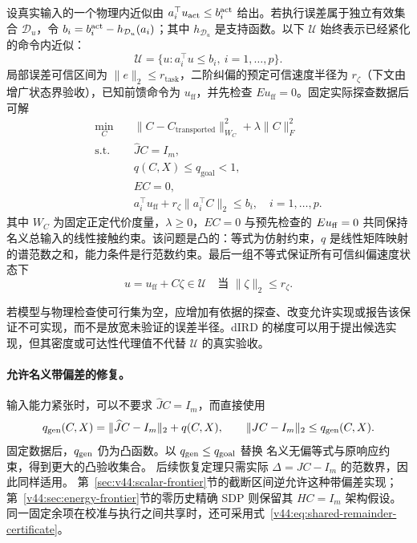 \documentclass[11pt,a4paper]{article}
\numberwithin{equation}{section}
\theoremstyle{definition}
\begin{document}
设真实输入的一个物理内近似由 $a_i^\top u_{\rm act}\le b_i^{\rm act}$ 给出。若执行误差属于独立有效集合 $\mathcal D_u$，令 $b_i=b_i^{\rm act}-h_{\mathcal D_u}(a_i)$；其中 $h_{\mathcal D_u}$ 是支持函数。以下 $\mathcal U$ 始终表示已经紧化的命令内近似：
\begin{equation}
  \mathcal U=
  \{u:a_i^\top u\le b_i,\ i=1,\ldots,p\}.
\end{equation}
局部误差可信区间为 $\|e\|_2\le r_{\mathrm{task}}$，二阶纠偏的预定可信速度半径为 $r_\zeta$（下文由增广状态界验收），已知前馈命令为 $u_{\mathrm{ff}}$，并先检查 $Eu_{\mathrm{ff}}=0$。固定实际探查数据后可解
\begin{equation}
\begin{aligned}
  \min_C\quad&
  \|C-C_{\mathrm{transported}}\|_{W_C}^2+
  \lambda\|C\|_F^2\\
  \text{s.t.}\quad&
  \widehat JC=I_m,\\
  &q(C,X)\le q_{\mathrm{goal}}<1,\\
  &EC=0,\\
  &a_i^\top u_{\mathrm{ff}}
   +r_\zeta\|a_i^\top C\|_2
   \le b_i,\quad i=1,\ldots,p.
\end{aligned}
\label{eq:cal-convex-repair}
\end{equation}
其中 $W_C$ 为固定正定代价度量，$\lambda\ge0$，$EC=0$ 与预先检查的 $Eu_{\rm ff}=0$ 共同保持名义总输入的线性接触约束。该问题是凸的：等式为仿射约束，$q$ 是线性矩阵映射的谱范数之和，能力条件是行范数约束。最后一组不等式保证所有可信纠偏速度状态下
\begin{equation}
  u=u_{\mathrm{ff}}+C\zeta\in\mathcal U\quad\text{当 }\|\zeta\|_2\le r_\zeta .
\end{equation}

若模型与物理检查使可行集为空，应增加有依据的探查、改变允许实现或报告该保证不可实现，而不是放宽未验证的误差半径。dIRD 的梯度可以用于提出候选实现，但其密度或可达性代理值不代替 $\mathcal U$ 的真实验收。




\paragraph{允许名义带偏差的修复。}
输入能力紧张时，可以不要求 $\widehat JC=I_m$，而直接使用
\begin{equation}
 q_{\rm gen}(C,X)=\|\widehat JC-I_m\|_2+q(C,X),
 \qquad \|JC-I_m\|_2\le q_{\rm gen}(C,X).
 \label{v44:eq:general-biased-certificate}
\end{equation}
固定数据后，$q_{\rm gen}$ 仍为凸函数。以 $q_{\rm gen}\le q_{\rm goal}$ 替换
名义无偏等式与原响应约束，得到更大的凸验收集合。
后续恢复定理只需实际 $\Delta=JC-I_m$ 的范数界，因此同样适用。
第~\ref{sec:v44:scalar-frontier}节的截断区间逆允许这种带偏差实现；
第~\ref{v44:sec:energy-frontier}节的零历史精确 SDP 则保留其 $HC=I_m$ 架构假设。
同一固定余项在校准与执行之间共享时，还可采用式~\eqref{v44:eq:shared-remainder-certificate}。
\end{document}
